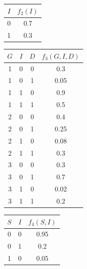 \begin{example}
\begin{table}[H]
        \begin{tabular}{c|c|}
        \cline{2-2}
        $I$                     & $f_2(I)$ \\ \hline
        \multicolumn{1}{|c|}{0} & 0.7      \\
        \multicolumn{1}{|c|}{1} & 0.3      \\ \hline
        \end{tabular}
    \end{table}
    \begin{table}[H]
        \centering
        \begin{tabular}{ccc|c|}
        \cline{4-4}
        $G$                    & $I$ & $D$ & $f_3(G,I,D)$ \\ \hline
        \multicolumn{1}{|c}{1} & 0   & 0   & 0.3          \\
        \multicolumn{1}{|c}{1} & 0   & 1   & 0.05         \\
        \multicolumn{1}{|c}{1} & 1   & 0   & 0.9          \\
        \multicolumn{1}{|c}{1} & 1   & 1   & 0.5          \\
        \multicolumn{1}{|c}{2} & 0   & 0   & 0.4          \\
        \multicolumn{1}{|c}{2} & 0   & 1   & 0.25         \\
        \multicolumn{1}{|c}{2} & 1   & 0   & 0.08         \\
        \multicolumn{1}{|c}{2} & 1   & 1   & 0.3          \\
        \multicolumn{1}{|c}{3} & 0   & 0   & 0.3          \\
        \multicolumn{1}{|c}{3} & 0   & 1   & 0.7          \\
        \multicolumn{1}{|c}{3} & 1   & 0   & 0.02         \\
        \multicolumn{1}{|c}{3} & 1   & 1   & 0.2          \\ \hline
        \end{tabular}
    \end{table}
    \begin{table}[H]
        \centering
        \begin{tabular}{cc|c|}
        \cline{3-3}
        $S$                     & $I$ & $f_4(S,I)$ \\ \hline
        \multicolumn{1}{|c}{0} & 0   & 0.95       \\
        \multicolumn{1}{|c}{0} & 1   & 0.2        \\
        \multicolumn{1}{|c}{1} & 0   & 0.05       \\

\end{tabular}
\end{table}
\end{example}
